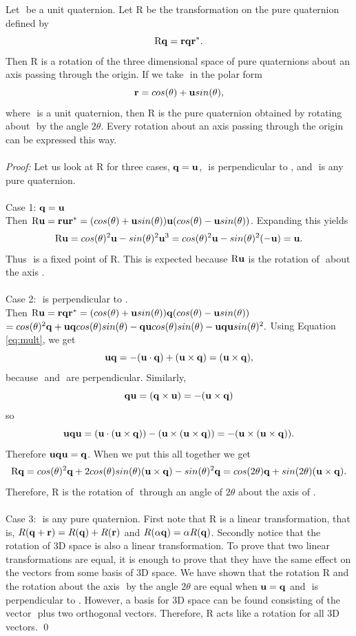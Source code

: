 \begin{thm}
Let \qr$ $ be a unit quaternion. Let R be the transformation on the pure quaternion \qq$ $ defined by $$ \text{R}\text{\textbf{q}} = \text{\textbf{r}} \text{\textbf{q}} \text{\textbf{r}}^*.$$
Then R is a rotation of the three dimensional space of pure quaternions about an axis passing through the origin.
If we take \qr$ $ in the polar form $$ \text{\textbf{r}} = cos(\theta) + \text{\textbf{u}} sin(\theta), $$ where \qu$ $ is a unit quaternion, then R\qq$ $ is the pure quaternion obtained by rotating \qq$ $ about \qu$ $ by the angle $2\theta$.
Every rotation about an axis passing through the origin can be expressed this way.
\\ \\ \noindent \textit{Proof:} Let us look at R\qq$ $ for three cases, $\text{\textbf{q}}=\text{\textbf{u}}$, \qq$ $ is perpendicular to \qu$ $, and \qq$ $ is any pure quaternion.
\\ \\ Case 1: $\text{\textbf{q}} = \text{\textbf{u}}$
\\ Then $\text{R}\text{\textbf{u}} = \text{\textbf{r}} \text{\textbf{u}} \text{\textbf{r}}^* = (cos(\theta) + \text{\textbf{u}} sin(\theta)) \text{\textbf{u}} (cos(\theta) - \text{\textbf{u}} sin(\theta))$.
Expanding this yields $$ \text{R}\text{\textbf{u}} = cos(\theta)^2\text{\textbf{u}} - sin(\theta)^2 \text{\textbf{u}}^3 = cos(\theta)^2 \text{\textbf{u}} - sin(\theta)^2 (-\text{\textbf{u}}) = \text{\textbf{u}}.$$
Thus \qu$ $ is a fixed point of R.
This is expected because $\text{R}\text{\textbf{u}}$ is the rotation of \qu$ $ about the axis \qu.
\\ \\ Case 2: \qq$ $ is perpendicular to \qu.
\\ Then $\text{R}\text{\textbf{u}} = \text{\textbf{r}} \text{\textbf{q}} \text{\textbf{r}}^* = (cos(\theta) + \text{\textbf{u}} sin(\theta))\text{\textbf{q}} (cos(\theta) - \text{\textbf{u}} sin(\theta))$
\\ $ = cos(\theta)^2 \text{\textbf{q}} + \text{\textbf{u}} \text{\textbf{q}} cos(\theta)sin(\theta) - \text{\textbf{q}} \text{\textbf{u}} cos(\theta) sin(\theta) - \text{\textbf{u}} \text{\textbf{q}} \text{\textbf{u}} sin(\theta)^2.$
Using Equation \ref{eq:mult}, we get $$ \text{\textbf{u}} \text{\textbf{q}} = -(\text{\textbf{u}} \cdot \text{\textbf{q}}) + (\text{\textbf{u}} \times \text{\textbf{q}}) = (\text{\textbf{u}} \times \text{\textbf{q}}),$$ because \qu$ $ and \qq$ $ are perpendicular.
Similarly, $$ \text{\textbf{q}} \text{\textbf{u}} = (\text{\textbf{q}} \times \text{\textbf{u}}) = -(\text{\textbf{u}} \times \text{\textbf{q}})$$ so $$ \text{\textbf{u}} \text{\textbf{q}} \text{\textbf{u}} = (\text{\textbf{u}} \cdot (\text{\textbf{u}} \times \text{\textbf{q}})) - (\text{\textbf{u}} \times (\text{\textbf{u}} \times \text{\textbf{q}})) = -(\text{\textbf{u}} \times(\text{\textbf{u}} \times \text{\textbf{q}})).$$
Therefore $ \text{\textbf{u}} \text{\textbf{q}} \text{\textbf{u}} = \text{\textbf{q}}$.
When we put this all together we get $$ \text{R}\text{\textbf{q}} = cos(\theta)^2 \text{\textbf{q}} + 2 cos(\theta)sin(\theta)(\text{\textbf{u}} \times \text{\textbf{q}}) - sin(\theta)^2 \text{\textbf{q}} \\ = cos(2\theta)\text{\textbf{q}} + sin(2\theta)(\text{\textbf{u}} \times \text{\textbf{q}}).$$
Therefore, R\qq$ $ is the rotation of \qq$ $ through an angle of $2\theta$ about the axis of \qu.
\\ \\ Case 3: \qq$ $ is any pure quaternion.
First note that R is a linear transformation, that is, $R(\text{\textbf{q}} + \text{\textbf{r}}) = R(\text{\textbf{q}}) + R(\text{\textbf{r}})$ and $R(\alpha\text{\textbf{q}}) = \alpha R(\text{\textbf{q}})$.
Secondly notice that the rotation of 3D space is also a linear transformation.
To prove that two linear transformations are equal, it is enough to prove that they have the same effect on the vectors from some basis of 3D space.
We have shown that the rotation R and the rotation about the axis \qu$ $ by the angle $2\theta$ are equal when $\text{\textbf{u}} = \text{\textbf{q}}$ and \qu$ $ is perpendicular to \qu.
However, a basis for 3D space can be found consisting of the vector \qu$ $ plus two orthogonal vectors.
Therefore, R acts like a rotation for all 3D vectors. \qed

\end{thm}
